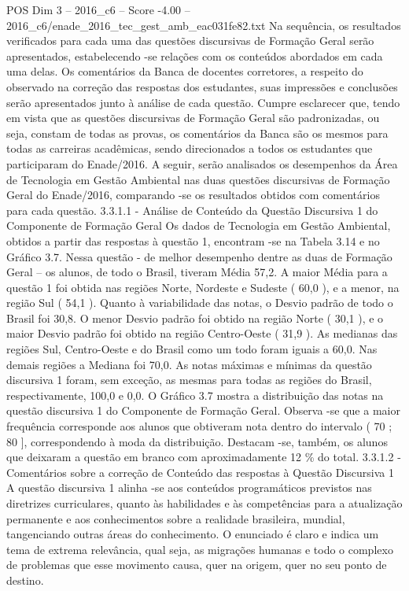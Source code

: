 \begin{textsample}{POS Dim 3 – 2016\_c6 – Score -4.00 – 2016\_c6/enade\_2016\_tec\_gest\_amb\_eac031fe82.txt}
Na sequência, os resultados verificados para cada uma das questões discursivas de Formação Geral serão apresentados, estabelecendo -se relações com os conteúdos abordados em cada uma delas.
Os comentários da Banca de docentes corretores, a respeito do observado na correção das respostas dos estudantes, suas impressões e conclusões serão apresentados junto à análise de cada questão.
Cumpre esclarecer que, tendo em vista que as questões discursivas de Formação Geral são padronizadas, ou seja, constam de todas as provas, os comentários da Banca são os mesmos para todas as carreiras acadêmicas, sendo direcionados a todos os estudantes que participaram do Enade/2016.
A seguir, serão analisados os desempenhos da Área de Tecnologia em Gestão Ambiental nas duas questões discursivas de Formação Geral do Enade/2016, comparando -se os resultados obtidos com comentários para cada questão. 3.3.1.1 - Análise de Conteúdo da Questão Discursiva 1 do Componente de Formação Geral Os dados de Tecnologia em Gestão Ambiental, obtidos a partir das respostas à questão 1, encontram -se na Tabela 3.14 e no Gráfico 3.7.
Nessa questão - de melhor desempenho dentre as duas de Formação Geral – os alunos, de todo o Brasil, tiveram Média 57,2.
A maior Média para a questão 1 foi obtida nas regiões Norte, Nordeste e Sudeste ( 60,0 ), e a menor, na região Sul ( 54,1 ).
Quanto à variabilidade das notas, o Desvio padrão de todo o Brasil foi 30,8.
O menor Desvio padrão foi obtido na região Norte ( 30,1 ), e o maior Desvio padrão foi obtido na região Centro-Oeste ( 31,9 ).
As medianas das regiões Sul, Centro-Oeste e do Brasil como um todo foram iguais a 60,0.
Nas demais regiões a Mediana foi 70,0.
As notas máximas e mínimas da questão discursiva 1 foram, sem exceção, as mesmas para todas as regiões do Brasil, respectivamente, 100,0 e 0,0.
O Gráfico 3.7 mostra a distribuição das notas na questão discursiva 1 do Componente de Formação Geral.
Observa -se que a maior frequência corresponde aos alunos que obtiveram nota dentro do intervalo ( 70 ; 80 ], correspondendo à moda da distribuição.
Destacam -se, também, os alunos que deixaram a questão em branco com aproximadamente 12 \% do total. 3.3.1.2 - Comentários sobre a correção de Conteúdo das respostas à Questão Discursiva 1 A questão discursiva 1 alinha -se aos conteúdos programáticos previstos nas diretrizes curriculares, quanto às habilidades e às competências para a atualização permanente e aos conhecimentos sobre a realidade brasileira, mundial, tangenciando outras áreas do conhecimento.
O enunciado é claro e indica um tema de extrema relevância, qual seja, as migrações humanas e todo o complexo de problemas que esse movimento causa, quer na origem, quer no seu ponto de destino.

\end{textsample}
